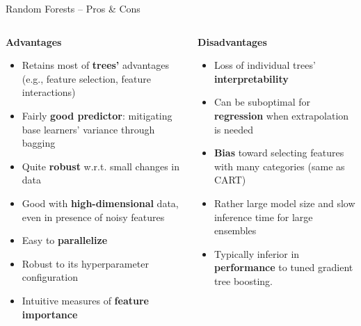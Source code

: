 \documentclass[11pt,compress,t,notes=noshow, xcolor=table]{beamer}
\newcommand{\highlight}[1]{\textcolor{hlcol}{\textbf{#1}}}
\newcommand{\positem}{\item[\textcolor{hlcol}{$\bm{+}$}]}
\newcommand{\negitem}{\item[\textcolor{hlcol}{$\bm{-}$}]}
\begin{document}
\begin{vbframe}{Random Forests -- Pros \& Cons}

  \begin{columns}[onlytextwidth]
    \begin{column}{0.5\textwidth}
      \highlight{Advantages}
      \footnotesize
      \begin{itemize}
        \positem Retains most of \textbf{trees'} advantages (e.g., feature selection, feature interactions)
        \positem Fairly \textbf{good predictor}: mitigating base learners' variance through bagging
        \positem Quite \textbf{robust} w.r.t. small changes in data
        \positem Good with \textbf{high-dimensional} data, even in presence of noisy features
        \positem Easy to \textbf{parallelize}
        \positem Robust to its hyperparameter configuration
        \positem Intuitive measures of \textbf{feature importance}
      \end{itemize}
    \end{column}
    \begin{column}{0.5\textwidth}
      \highlight{Disadvantages}
      \footnotesize
      \begin{itemize}
        \negitem Loss of individual trees' \textbf{interpretability}
        \negitem Can be suboptimal for \textbf{regression} when extrapolation is needed
        \negitem \textbf{Bias} toward selecting features with many categories (same as CART)
        \negitem Rather large model size and slow inference time for large ensembles
        \negitem Typically inferior in \textbf{performance} to tuned gradient tree boosting.
      \end{itemize}
    \end{column}
  \end{columns}
  
\end{vbframe}
\end{document}
